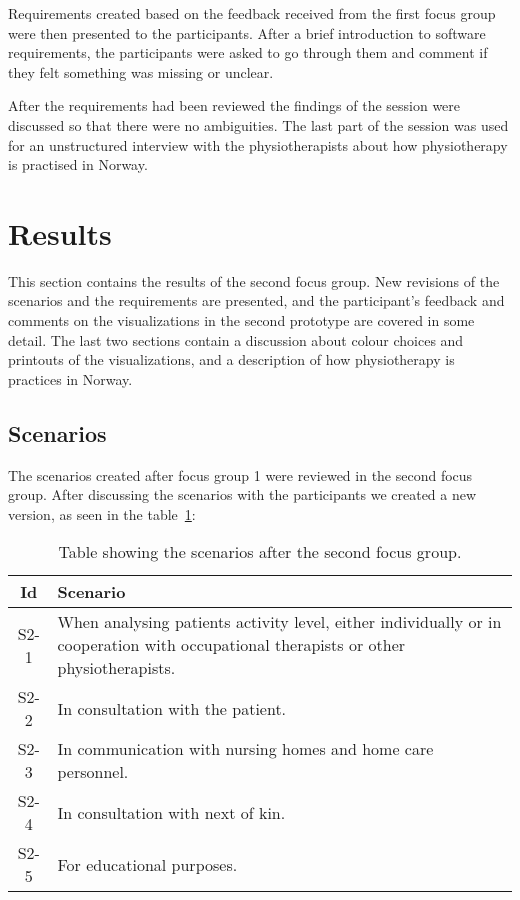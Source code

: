 Requirements created based on the feedback received from the first focus group were then presented to the participants. After a brief introduction to software requirements, the participants were asked to go through them and comment if they felt something was missing or unclear.

After the requirements had been reviewed the findings of the session were discussed so that there were no ambiguities. The last part of the session was used for an unstructured interview with the physiotherapists about how physiotherapy is practised in Norway. 

\section{Results}
This section contains the results of the second focus group. New revisions of the scenarios and the requirements are presented, and the participant's feedback and comments on the visualizations in the second prototype are covered in some detail. The last two sections contain a discussion about colour choices and printouts of the visualizations, and a description of how physiotherapy is practices in Norway.

\subsection{Scenarios}
The scenarios created after focus group 1 were reviewed in the second focus group. After discussing the scenarios with the participants we created a new version, as seen in the table~\ref{tab:scen2}:

\begin{table}[h!]
  \centering
  \begin{tabular}{|c|p{9cm}|}
    \hline
    \textbf{Id} & \textbf{Scenario} \\ \hline
    S2-1 & When analysing patients activity level, either individually or in cooperation with occupational therapists or other physiotherapists. \\ \hline
    S2-2 & In consultation with the patient. \\ \hline
    S2-3 & In communication with nursing homes and home care personnel. \\ \hline
    S2-4 & In consultation with next of kin. \\ \hline
    S2-5 & For educational purposes. \\ \hline
  \end{tabular}
  \caption{Table showing the scenarios after the second focus group.}
  \label{tab:scen2}
\end{table}

